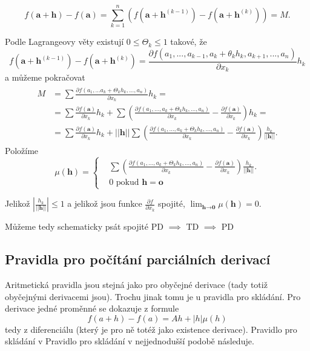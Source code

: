 \documentclass[../main.tex]{subfiles}
\begin{document}
\[f(\textbf{a}+\textbf{h}) - f(\textbf{a}) = \sum^n_{k=1}(f(\textbf{a}+\textbf{h}^{(k-1)})-f(\textbf{a}+\textbf{h}^{(k)})) = M.\]

\noindent
\hspace{1.2mm}
Podle Lagrangeovy věty existují $0 \leq \Theta_k \leq 1$ takové, že
\[f(\textbf{a}+\textbf{h}^{(k-1)})-f(\textbf{a}+\textbf{h}^{(k)}) = \frac{\partial f(a_1,...,a_{k-1},a_k+ \theta_kh_k,a_{k+1},...,a_n)}{\partial x_k}h_k\]
a můžeme pokračovat
\begin{align*} 
\begin{split}
M & = \sum\frac{\partial f(a_1,...a_k+\Theta_kh_k,...,a_n)}{\partial x_k}h_k = \\
 & = \sum \frac{\partial f(\textbf{a})}{\partial x_k}h_k + \sum \left( \frac{\partial f(a_1,...,a_k+\Theta_kh_k,...,a_n)}{\partial x_k}
 - \frac{\partial f(\textbf{a})}{\partial x_k} \right)h_k = \\
 & = \sum \frac{\partial f(\textbf{a})}{\partial x_k}h_k + ||\textbf{h}||\sum\left(\frac{\partial f(a_1,...,a_k+\Theta_kh_k,...,a_n)}
 {\partial x_k}- \frac{\partial f(\textbf{a})}{\partial x_k}\right)\frac{h_k}{||\textbf{h}||}.
\end{split}
\end{align*}
Položíme
\[\mu (\textbf{h}) =
    \begin{cases} & \sum\left(\frac{\partial f(a_1,...,a_k+\Theta_kh_k,...,a_n)}{\partial x_k} -
    \frac{\partial f(\textbf{a})}{\partial x_k} \right)\frac{h_k}{||\textbf{h}||}.\\
    & 0 \text{ pokud } \mathbf{h} = \mathbf{o}
    \end{cases}\]

    Jelikož $\left|\frac{h_k}{||\textbf{h}||}\right| \leq 1$ a jelikož jsou funkce $\frac{\partial f}{\partial x_k}$ spojité,
    $\lim_{\textbf{h}\rightarrow \textbf{0}} \mu (\textbf{h}) = 0$.

    \begin{center}
    \LARGE 
    Můžeme tedy schematicky psát
    \LARGE 
    spojité PD $\implies$ TD $\implies$ PD
    \end{center}
\noindent

\subsection{Pravidla pro počítání parciálních derivací}
\hspace{1.2mm}
\noindent
Aritmetická pravidla jsou stejná jako pro obyčejné derivace (tady totiž obyčejnými derivacemi jsou).
Trochu jinak tomu je u pravidla pro skládání. Pro derivace jedné proměnné se dokazuje z formule
\[ f(a+h) - f(a) = Ah + |h|\mu (h) \]
tedy z diferenciálu (který je pro ně totéž jako existence derivace). Pravidlo pro skládání v
Pravidlo pro skládání v nejjednodušší podobě následuje.
\end{document}
